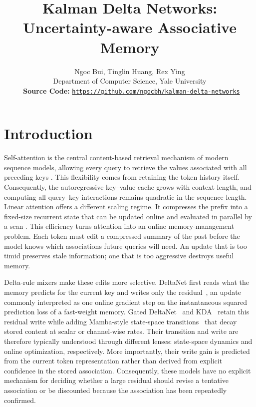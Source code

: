\documentclass[11pt,letterpaper,logo]{yalearxiv}
\title{Kalman Delta Networks: Uncertainty-aware Associative Memory}
\author{Ngoc Bui\yale, Tinglin Huang\yale, Rex Ying\yale\\
\yale Department of Computer Science, Yale University\\
\faGithub~\textbf{Source Code:} \href{https://github.com/ngocbh/kalman-delta-networks}{\texttt{https://github.com/ngocbh/kalman-delta-networks}}
}
\begin{document}
\maketitle


\section{Introduction}
\label{sec:intro}

Self-attention is the central content-based retrieval mechanism of modern sequence models, allowing
every query to retrieve the values associated with all preceding keys
\citep{vaswani2017attention}. This flexibility comes from retaining the token history itself.
Consequently, the autoregressive key--value cache grows with context length, and computing all
query--key interactions remains quadratic in the sequence length. Linear attention offers a
different scaling regime. It compresses the prefix into a fixed-size recurrent state that can
be updated online and evaluated in parallel by a scan
\citep{katharopoulos2020transformers}. This efficiency turns attention into an online
memory-management problem. Each token must edit a compressed summary of the past before the model
knows which associations future queries will need. An update that is too timid preserves stale
information; one that is too aggressive destroys useful memory.

Delta-rule mixers make these edits more selective. DeltaNet first reads what the memory predicts
for the current key and writes only the residual~\citep{schlag2021linear,yang2024parallelizing},
an update commonly interpreted as one online gradient step on the instantaneous squared prediction
loss of a fast-weight memory. Gated DeltaNet~\citep{yang2024gdn} and
KDA~\citep{kimiteam2025kimilinear} retain this residual write while adding Mamba-style state-space
transitions~\citep{gu2023mamba,dao2024transformers} that decay stored content at scalar or
channel-wise rates. Their transition and write
are therefore typically understood through different lenses: state-space dynamics and online
optimization, respectively. More importantly, their write gain is predicted from the current token
representation rather than derived from explicit confidence in the stored association.
Consequently, these models have no explicit mechanism for deciding whether a large residual should
revise a tentative association or be discounted because the association has been repeatedly
confirmed.
\end{document}
